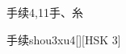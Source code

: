 \begin{entry}{手续}{4,11}{⼿、⽷}
  \begin{phonetics}{手续}{shou3xu4}[][HSK 3]
  \end{phonetics}
\end{entry}

